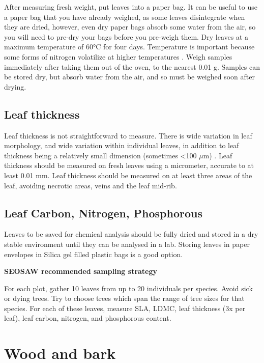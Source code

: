 \documentclass[11pt,a4paper]{article}
\begin{document}
After measuring fresh weight, put leaves into a paper bag. It can be useful to use a paper bag that you have already weighed, as some leaves disintegrate when they are dried, however, even dry paper bags absorb some water from the air, so you will need to pre-dry your bags before you pre-weigh them. Dry leaves at a maximum temperature of 60\si{\degree}C for four days. Temperature is important because some forms of nitrogen volatilize at higher temperatures \citep{Babu2018}. Weigh samples immediately after taking them out of the oven, to the nearest 0.01 g. Samples can be stored dry, but absorb water from the air, and so must be weighed soon after drying. 

\subsection{Leaf thickness}

Leaf thickness is not straightforward to measure. There is wide variation in leaf morphology, and wide variation within individual leaves, in addition to leaf thickness being a relatively small dimension (sometimes <100 $\mu$m) \citep{Vile2005}. Leaf thickness should be measured on fresh leaves using a micrometer, accurate to at least 0.01 mm. Leaf thickness should be measured on at least three areas of the leaf, avoiding necrotic areas, veins and the leaf mid-rib.

\subsection{Leaf Carbon, Nitrogen, Phosphorous}

Leaves to be saved for chemical analysis should be fully dried and stored in a dry stable environment until they can be analysed in a lab. Storing leaves in paper envelopes in Silica gel filled plastic bags is a good option.

\begin{framed}
{\large{\textbf{SEOSAW recommended sampling strategy}}}

For each plot, gather 10 leaves from up to 20 individuals per species. Avoid sick or dying trees. Try to choose trees which span the range of tree sizes for that species. For each of these leaves, measure SLA, LDMC, leaf thickness (3x per leaf), leaf carbon, nitrogen, and phosphorous content.

\end{framed}


\section{Wood and bark}
\end{document}
